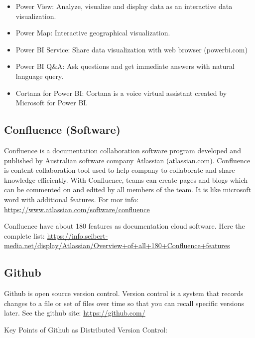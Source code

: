 \documentclass[]{book}
\begin{document}
\begin{itemize}
\item
  Power View: Analyze, visualize and display data as an interactive data
  visualization.
\item
  Power Map: Interactive geographical visualization.
\item
  Power BI Service: Share data visualization with web browser
  (powerbi.com)
\item
  Power BI Q\&A: Ask questions and get immediate answers with natural
  language query.
\item
  Cortana for Power BI: Cortana is a voice virtual assistant created by
  Microsoft for Power BI.
\end{itemize}

\subsection{Confluence (Software)}\label{confluence-software}

Confluence is a documentation collaboration software program developed
and published by Australian software company Atlassian (atlassian.com).
Confluence is content collaboration tool used to help company to
collaborate and share knowledge efficiently. With Confluence, teams can
create pages and blogs which can be commented on and edited by all
members of the team. It is like microsoft word with additional features.
For mor info: \url{https://www.atlassian.com/software/confluence}

Confluence have about 180 features as documentation cloud software. Here
the complete list:
\url{https://info.seibert-media.net/display/Atlassian/Overview+of+all+180+Confluence+features}

\subsection{Github}\label{github}

Github is open source version control. Version control is a system that
records changes to a file or set of files over time so that you can
recall specific versions later. See the github site:
\url{https://github.com/}

Key Points of Github as Distributed Version Control:
\end{document}
